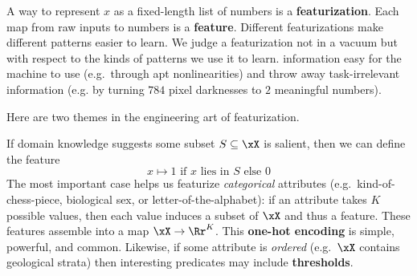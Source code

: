   A way to represent $x$ as a fixed-length list of numbers is a
  \textbf{featurization}.  Each map from raw inputs to numbers is
  a \textbf{feature}.
  Different featurizations make different
  patterns easier to learn.
  We judge a featurization not in a vacuum but with respect to the kinds of
  patterns we use it to learn. %
  information easy for the machine to use (e.g.\ through apt nonlinearities)
  and throw away task-irrelevant information (e.g. by turning $784$ pixel
  darknesses to $2$ meaningful numbers).

  Here are two themes in the engineering art of featurization.

  If domain knowledge suggests some subset
  $S \subseteq \xX$ is salient, then we can define the feature
  $$
    x \mapsto \text{$1$ if $x$ lies in $S$ else $0$}
  $$
  The most important case helps us featurize \emph{categorical} attributes
  (e.g.\ kind-of-chess-piece, biological sex, or letter-of-the-alphabet):
  if an attribute takes $K$ possible values, then each value induces a
  subset of $\xX$ and thus a feature.  These features assemble into a map
  $\xX\to\Rr^K$.  This \textbf{one-hot encoding} is simple, powerful, and
  common.
  Likewise, if some attribute is \emph{ordered} (e.g.\ $\xX$
  contains
  geological strata)
  then interesting predicates may include \textbf{thresholds}.


